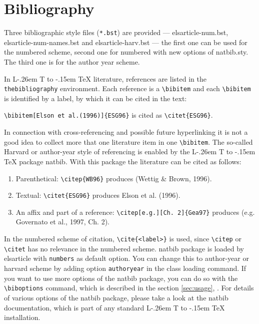 \documentclass[a4paper,12pt]{article}
\makeatletter
\def\file#1{\textsf{#1}\xspace}
\DeclareRobustCommand{\LaTeX}{L\kern-.26em%
        {\sbox\z@ T%
         \vbox to\ht\z@{\hbox{\check@mathfonts
           \fontsize\sf@size\z@
           \math@fontsfalse\selectfont
          A\,}%
         \vss}%
        }%
     \kern-.15em%
    \TeX}
\makeatother
\begin{document}
\section{Bibliography}

Three bibliographic style files (\verb+*.bst+) are provided ---
\file{elsarticle-num.bst}, \file{elsarticle-num-names.bst} and
\file{elsarticle-harv.bst} --- the first one can be used for the
numbered scheme, second one for numbered with new options of
\file{natbib.sty}. The third one is for the author year
scheme.

In \LaTeX{} literature, references are listed in the
\verb+thebibliography+ environment.  Each reference is a
\verb+\bibitem+ and each \verb+\bibitem+ is identified by a label,
by which it can be cited in the text:

\verb+\bibitem[Elson et al.(1996)]{ESG96}+ is cited as
\verb+\citet{ESG96}+.

\noindent In connection with cross-referencing and
possible future hyperlinking it is not a good idea to collect
more that one literature item in one \verb+\bibitem+.  The
so-called Harvard or author-year style of referencing is enabled
by the \LaTeX{} package \file{natbib}. With this package the
literature can be cited as follows:

\begin{enumerate}[\textbullet]
\item Parenthetical: \verb+\citep{WB96}+ produces (Wettig \& Brown, 1996).
\item Textual: \verb+\citet{ESG96}+ produces Elson et al. (1996).
\item An affix and part of a reference:
\verb+\citep[e.g.][Ch. 2]{Gea97}+ produces (e.g. Governato et
al., 1997, Ch. 2).
\end{enumerate}

In the numbered scheme of citation, \verb+\cite{<label>}+ is used,
since \verb+\citep+ or \verb+\citet+ has no relevance in the numbered
scheme.  \file{natbib} package is loaded by \file{elsarticle} with
\verb+numbers+ as default option.  You can change this to author-year
or harvard scheme by adding option \verb+authoryear+ in the class
loading command.  If you want to use more options of the \file{natbib}
package, you can do so with the \verb+\biboptions+ command, which is
described in the section \ref{sec:usage}, .  For
details of various options of the \file{natbib} package, please take a
look at the \file{natbib} documentation, which is part of any standard
\LaTeX{} installation.
\end{document}
